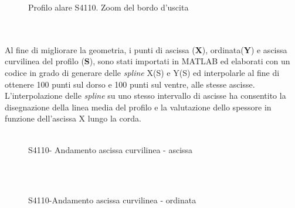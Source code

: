 \begin{figure} [h!]
\centering
{}
\caption{\footnotesize Profilo alare S4110. Zoom del bordo d'uscita }\label{fig:cp}
\end{figure}
\noindent
 \\ \\




 Al fine di migliorare la geometria, i punti di ascissa ({\bfseries X}), ordinata({\bfseries Y}) e ascissa curvilinea del profilo ({\bfseries S}),  sono stati importati in MATLAB ed elaborati con un codice in grado di generare delle {\itshape spline} X(S) e Y(S) ed interpolarle al fine di ottenere 100 punti sul dorso e 100 punti sul ventre, alle stesse ascisse.
L'interpolazione delle {\itshape spline} su uno stesso intervallo di ascisse ha consentito la disegnazione della linea media del profilo e la valutazione dello spessore in funzione dell’ascissa X lungo la corda.\\ \\


\begin{figure} [h!]
\centering
{}
\caption{\footnotesize S4110- Andamento ascissa curvilinea - ascissa }\label{fig:cp}
\end{figure}
\noindent
 \\ \\

\begin{figure} [h!]
\centering
{}
\caption{\footnotesize  S4110-Andamento ascissa curvilinea - ordinata}\label{fig:cp}
\end{figure}
\noindent
 \\ 


